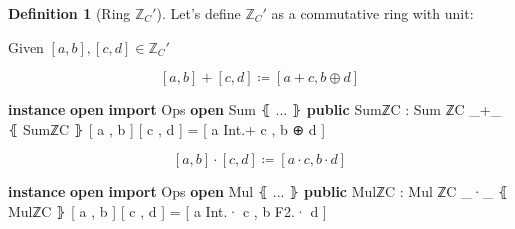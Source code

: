 \documentclass[
]{article}
\newenvironment{Shaded}{\begin{snugshade}}{\end{snugshade}}
\newcommand{\KeywordTok}[1]{\textcolor[rgb]{0.13,0.29,0.53}{\textbf{#1}}}
\newcommand{\NormalTok}[1]{#1}
\newcommand{\OtherTok}[1]{\textcolor[rgb]{0.56,0.35,0.01}{#1}}
\theoremstyle{definition}
\newtheorem{definition}{Definition}[section]
\theoremstyle{definition}
\theoremstyle{definition}
\theoremstyle{definition}
\theoremstyle{remark}
\begin{document}
\begin{definition}[Ring $\mathbb{Z}_C'$]

Let's define \(\mathbb{Z}_C'\) as a commutative ring with unit:

Given \([a,b], [c,d] \in \mathbb{Z}_C'\)

\[[a,b] + [c,d] \coloneqq [a+c, b\oplus d]\]

\begin{Shaded}
\begin{Highlighting}[]
\KeywordTok{instance}
  \KeywordTok{open} \KeywordTok{import}\NormalTok{ Ops}
  \KeywordTok{open}\NormalTok{ Sum ⦃ }\OtherTok{...}\NormalTok{ ⦄ }\KeywordTok{public}
\NormalTok{  SumℤC\textquotesingle{} }\OtherTok{:}\NormalTok{ Sum ℤC\textquotesingle{}}
  \OtherTok{\_}\NormalTok{+}\OtherTok{\_}\NormalTok{ ⦃ SumℤC\textquotesingle{} ⦄ [ a , b ] [ c , d ] }\OtherTok{=}\NormalTok{ [ a Int}\OtherTok{.}\NormalTok{+ c , b ⊕ d ]}
\end{Highlighting}
\end{Shaded}

\[[a,b] \cdot [c,d] \coloneqq [a\cdot c, b\cdot d]\]

\begin{Shaded}
\begin{Highlighting}[]
\KeywordTok{instance}
  \KeywordTok{open} \KeywordTok{import}\NormalTok{ Ops}
  \KeywordTok{open}\NormalTok{ Mul ⦃ }\OtherTok{...}\NormalTok{ ⦄ }\KeywordTok{public}
\NormalTok{  MulℤC\textquotesingle{} }\OtherTok{:}\NormalTok{ Mul ℤC\textquotesingle{}}
  \OtherTok{\_}\NormalTok{·}\OtherTok{\_}\NormalTok{ ⦃ MulℤC\textquotesingle{} ⦄ [ a , b ] [ c , d ] }\OtherTok{=}\NormalTok{ [ a Int}\OtherTok{.}\NormalTok{· c , b F2}\OtherTok{.}\NormalTok{· d ]}
\end{Highlighting}
\end{Shaded}

\end{definition}
\end{document}
